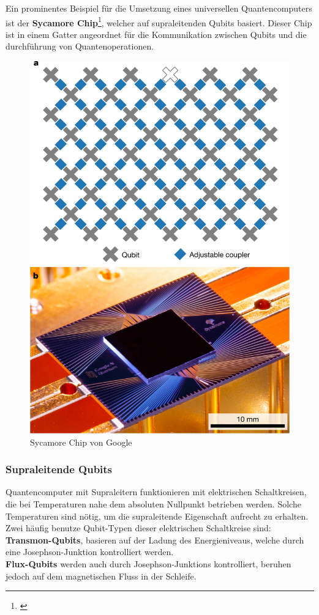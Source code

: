 Ein prominentes Beispiel für die Umsetzung eines universellen Quantencomputers ist der \textbf{Sycamore Chip}\footnote{\cite{arute_quantum_2019}}, welcher auf supraleitenden Qubits basiert.
Dieser Chip ist in einem Gatter angeordnet für die Kommunikation zwischen Qubits und die durchführung von Quantenoperationen.\\

\begin{figure}[H]
    \centering
    \includegraphics[width=0.7\linewidth]{img/SycamoreChip.png}
    \caption{Sycamore Chip von Google \cite{arute_quantum_2019}}
    \label{fig:Sycamore}
\end{figure}

\subsubsection{Supraleitende Qubits}
\label{subsub:superleiter}
Quantencomputer mit Supraleitern funktionieren mit elektrischen Schaltkreisen, die bei Temperaturen nahe dem absoluten Nullpunkt betrieben werden. Solche Temperaturen sind nötig,
um die supraleitende Eigenschaft aufrecht zu erhalten.\\

Zwei häufig benutze Qubit-Typen dieser elektrischen Schaltkreise sind:\\
\textbf{Transmon-Qubits}, basieren auf der Ladung des Energieniveaus, welche durch eine Josephson-Junktion kontrolliert werden.\\
\textbf{Flux-Qubits} werden auch durch Josephson-Junktions kontrolliert, beruhen jedoch auf dem magnetischen Fluss in der Schleife.\\

